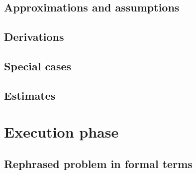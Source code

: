 \documentclass[a4paper, 12pt, notitlepage]{report}
\begin{document}
\section{Approximations and assumptions}
\section{Derivations}
\section{Special cases}
\section{Estimates}

\chapter{Execution phase}
\section{Rephrased problem in formal terms}



\end{document}
